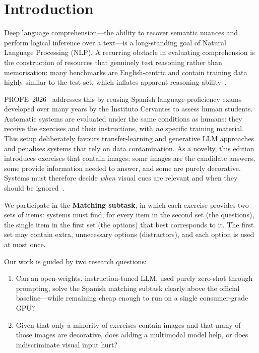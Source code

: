 \documentclass{ceurart}   %
\begin{document}
\maketitle

\section{Introduction}
Deep language comprehension---the ability to recover semantic nuances and
perform logical inference over a text---is a long-standing goal of Natural
Language Processing (NLP). A recurring obstacle in evaluating comprehension
is the construction of resources that genuinely test reasoning rather than
memorisation: many benchmarks are English-centric and contain training data
highly similar to the test set, which inflates apparent reasoning
ability~\cite{lai2017race}.

PROFE~2026~\cite{profe2026overview} addresses this by reusing Spanish
language-proficiency exams developed over many years by the Instituto
Cervantes to assess human students. Automatic systems are evaluated under
the same conditions as humans: they receive the exercises and their
instructions, with \emph{no} specific training material. This setup
deliberately favours transfer-learning and generative LLM approaches and
penalises systems that rely on data contamination. As a novelty, this
edition introduces exercises that contain images: some images are the
candidate answers, some provide information needed to answer, and some are
purely decorative. Systems must therefore decide \emph{when} visual cues are
relevant and when they should be ignored~\cite{penas2026profe}.

We participate in the \textbf{Matching subtask}, in which each exercise
provides two sets of items: systems must find, for every item in the second
set (the questions), the single item in the first set (the options) that
best corresponds to it. The first set may contain extra, unnecessary
options (distractors), and each option is used at most once.

Our work is guided by two research questions:
\begin{enumerate}
  \item Can an open-weights, instruction-tuned LLM, used purely
        zero-shot through prompting, solve the Spanish matching subtask
        clearly above the official baseline---while remaining cheap enough
        to run on a single consumer-grade GPU?
  \item Given that only a minority of exercises contain images and that many
        of those images are decorative, does adding a multimodal model
        help, or does indiscriminate visual input hurt?
\end{enumerate}
\end{document}
